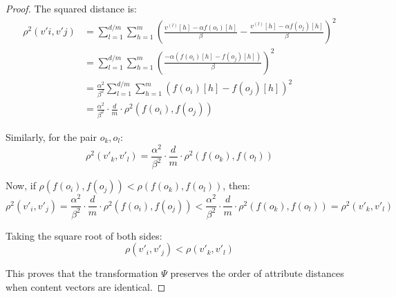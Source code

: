 \documentclass[numbers,sort]{article}
\begin{document}
\begin{proof}
The squared distance is:
\begin{align}
\rho^2(v'i, v'j) &= \sum_{l=1}^{d/m} \sum_{h=1}^{m} \left(\frac{v^{(l)}[h] - \alpha f(o_i)[h]}{\beta} - \frac{v^{(l)}[h] - \alpha f(o_j)[h]}{\beta}\right)^2 \\
&= \sum_{l=1}^{d/m} \sum_{h=1}^{m} \left(\frac{-\alpha(f(o_i)[h] - f(o_j)[h])}{\beta}\right)^2 \\
&= \frac{\alpha^2}{\beta^2}\sum_{l=1}^{d/m} \sum_{h=1}^{m} (f(o_i)[h] - f(o_j)[h])^2 \\
&= \frac{\alpha^2}{\beta^2} \cdot \frac{d}{m} \cdot \rho^2(f(o_i), f(o_j))
\end{align}

Similarly, for the pair $o_k, o_l$:
\begin{equation}
\rho^2(v'_k, v'_l) = \frac{\alpha^2}{\beta^2} \cdot \frac{d}{m} \cdot \rho^2(f(o_k), f(o_l))
\end{equation}

Now, if $\rho(f(o_i), f(o_j)) < \rho(f(o_k), f(o_l))$, then:
\begin{equation}
\rho^2(v'_i, v'_j) = \frac{\alpha^2}{\beta^2} \cdot \frac{d}{m} \cdot \rho^2(f(o_i), f(o_j)) < \frac{\alpha^2}{\beta^2} \cdot \frac{d}{m} \cdot \rho^2(f(o_k), f(o_l)) = \rho^2(v'_k, v'_l)
\end{equation}

Taking the square root of both sides:
\begin{equation}
\rho(v'_i, v'_j) < \rho(v'_k, v'_l)
\end{equation}

This proves that the transformation $\Psi$ preserves the order of attribute distances when content vectors are identical.
\end{proof}
\end{document}
